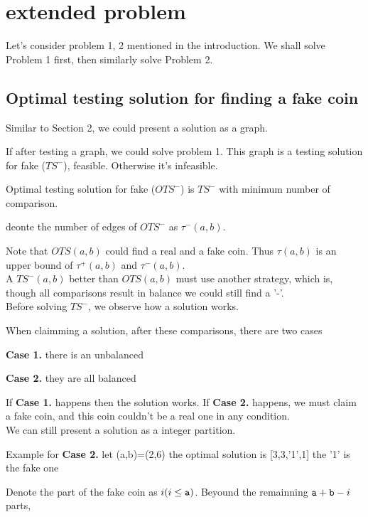 \section{extended problem}
Let's consider problem 1, 2 mentioned in the introduction.
We shall solve Problem 1 first, then similarly solve Problem 2.


\subsection*{Optimal testing solution for finding a fake coin}
Similar to Section 2, we could present a solution as a graph.

If after testing a graph, we could solve problem 1.
This graph is a testing solution for fake ($TS^-$), feasible. Otherwise it's infeasible.

\begin{definition}
Optimal testing solution for fake ($OTS^-$) is $TS^-$ with minimum number of comparison.

deonte the number of edges of $OTS^-$ as $\tau^-(a,b)$.
\end{definition}

Note that $OTS(a,b)$ could find a real and a fake coin. Thus $\tau(a,b)$
is an upper bound of $\tau^+(a,b)$ and $\tau^-(a,b)$.\\

A $TS^-(a,b)$ better than $OTS(a,b)$ must use another strategy, which is, though all comparisons result in balance we could still find a '-'.\\

Before solving $TS^-$, we observe how a solution works.

When claimming a solution, after these comparisons, there are two cases

\textbf{Case 1.} there is an unbalanced

\textbf{Case 2.} they are all balanced

If \textbf{Case 1.} happens then the solution works.
If \textbf{Case 2.} happens, we must claim a fake coin, and this coin couldn't be a real one in any condition.\\

We can still present a solution as a integer partition.

Example for \textbf{Case 2.} let (a,b)=(2,6)
the optimal solution is [3,3,'1',1] the '1' is the fake one

Denote the part of the fake coin as $i(i\leq\mathtt{a})$. 
Beyound the remainning $\mathtt{a}+\mathtt{b}-i$ parts, 

